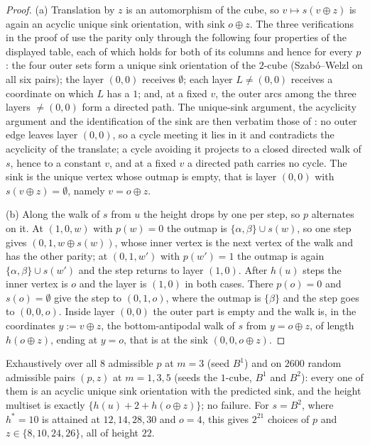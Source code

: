 \begin{proof}
(a) Translation by $z$ is an automorphism of the cube, so $v\mapsto s(v\oplus z)$
is again an acyclic unique sink orientation, with sink $o\oplus z$. The three
verifications in the proof of  use the parity only through the
following four properties of the displayed table, each of which holds for both
of its columns and hence for every $p$: the four outer sets form a unique sink
orientation of the $2$-cube (Szab\'o--Welzl on all six pairs); the layer $(0,0)$
receives $\emptyset$; each layer $L\ne(0,0)$ receives a coordinate on which $L$
has a $1$; and, at a fixed $v$, the outer arcs among the three layers
$\ne(0,0)$ form a directed path. The unique-sink argument, the acyclicity
argument and the identification of the sink are then verbatim those of
: no outer edge leaves layer $(0,0)$, so a cycle meeting it
lies in it and contradicts the acyclicity of the translate; a cycle avoiding it
projects to a closed directed walk of $s$, hence to a constant $v$, and at a
fixed $v$ a directed path carries no cycle. The sink is the unique vertex whose
outmap is empty, that is layer $(0,0)$ with $s(v\oplus z)=\emptyset$, namely
$v=o\oplus z$.

(b) Along the walk of $s$ from $u$ the height drops by one per step, so $p$
alternates on it. At $(1,0,w)$ with $p(w)=0$ the outmap is
$\{\alpha,\beta\}\cup s(w)$, so one step gives $(0,1,w\oplus s(w))$, whose
inner vertex is the next vertex of the walk and has the other parity; at
$(0,1,w')$ with $p(w')=1$ the outmap is again $\{\alpha,\beta\}\cup s(w')$ and
the step returns to layer $(1,0)$. After $h(u)$ steps the inner vertex is $o$
and the layer is $(1,0)$ in both cases. There $p(o)=0$ and $s(o)=\emptyset$
give the step to $(0,1,o)$, where the outmap is $\{\beta\}$ and the step goes
to $(0,0,o)$. Inside layer $(0,0)$ the outer part is empty and the walk is, in
the coordinates $y:=v\oplus z$, the bottom-antipodal walk of $s$ from
$y=o\oplus z$, of length $h(o\oplus z)$, ending at $y=o$, that is at the sink
$(0,0,o\oplus z)$.
\end{proof}

\begin{remark}[measured]\label{b3:free-parity-measured}
Exhaustively over all $8$ admissible $p$ at $m=3$ (seed $B^{1}$) and on $2600$
random admissible pairs $(p,z)$ at $m=1,3,5$ (seeds the $1$-cube, $B^{1}$ and
$B^{2}$): every one of them is an acyclic unique sink orientation with the
predicted sink, and the height multiset is exactly
$\{h(u)+2+h(o\oplus z)\}$; no failure. For $s=B^{2}$, where
$h^{\ast}=10$ is attained at $12,14,28,30$ and $o=4$, this gives $2^{21}$
choices of $p$ and $z\in\{8,10,24,26\}$, all of height $22$.
\end{remark}

